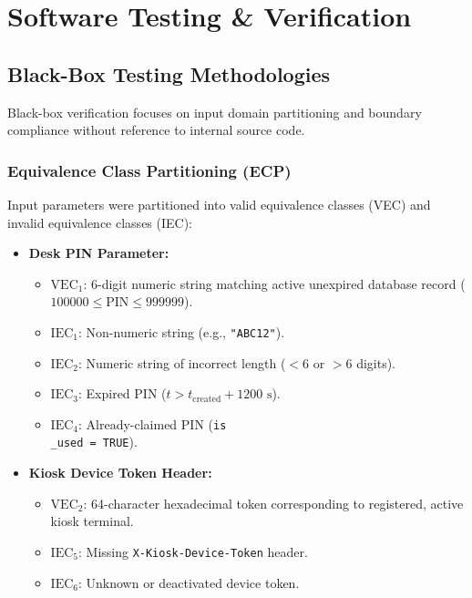 \documentclass[12pt,a4paper,oneside]{report}
\begin{document}
\chapter{Software Testing \& Verification}
\label{chap:testing}

\section{Black-Box Testing Methodologies}
Black-box verification focuses on input domain partitioning and boundary compliance without reference to internal source code.

\subsection{Equivalence Class Partitioning (ECP)}
Input parameters were partitioned into valid equivalence classes (VEC) and invalid equivalence classes (IEC):
\begin{itemize}
    \item \textbf{Desk PIN Parameter:}
    \begin{itemize}
        \item $\text{VEC}_1$: 6-digit numeric string matching active unexpired database record ($100000 \le \text{PIN} \le 999999$).
        \item $\text{IEC}_1$: Non-numeric string (e.g., \texttt{"ABC12"}).
        \item $\text{IEC}_2$: Numeric string of incorrect length ($<6$ or $>6$ digits).
        \item $\text{IEC}_3$: Expired PIN ($t > t_{\text{created}} + 1200\text{ s}$).
        \item $\text{IEC}_4$: Already-claimed PIN (\texttt{is\\_used = TRUE}).
    \end{itemize}
    \item \textbf{Kiosk Device Token Header:}
    \begin{itemize}
        \item $\text{VEC}_2$: 64-character hexadecimal token corresponding to registered, active kiosk terminal.
        \item $\text{IEC}_5$: Missing \texttt{X-Kiosk-Device-Token} header.
        \item $\text{IEC}_6$: Unknown or deactivated device token.
    \end{itemize}
\end{itemize}
\end{document}
